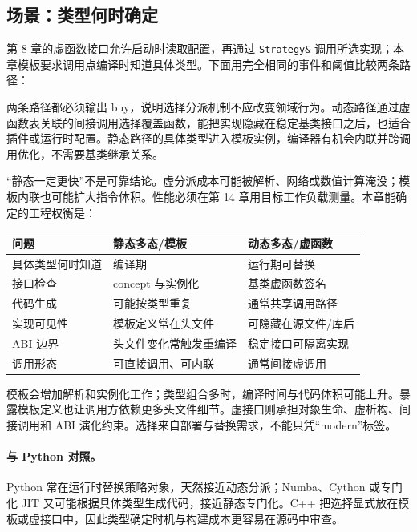 \subsection{场景：类型何时确定}

第 8 章的虚函数接口允许启动时读取配置，再通过 \texttt{Strategy\&} 调用所选实现；本章模板要求调用点编译时知道具体类型。下面用完全相同的事件和阈值比较两条路径：



两条路径都必须输出 buy，说明选择分派机制不应改变领域行为。动态路径通过虚函数表关联的间接调用选择覆盖函数，能把实现隐藏在稳定基类接口之后，也适合插件或运行时配置。静态路径的具体类型进入模板实例，编译器有机会内联并跨调用优化，不需要基类继承关系。

“静态一定更快”不是可靠结论。虚分派成本可能被解析、网络或数值计算淹没；模板内联也可能扩大指令体积。性能必须在第 14 章用目标工作负载测量。本章能确定的工程权衡是：

\begin{center}
\begin{tabular}{lll}
\toprule
问题 & 静态多态/模板 & 动态多态/虚函数 \\
\midrule
具体类型何时知道 & 编译期 & 运行期可替换 \\
接口检查 & concept 与实例化 & 基类虚函数签名 \\
代码生成 & 可能按类型重复 & 通常共享调用路径 \\
实现可见性 & 模板定义常在头文件 & 可隐藏在源文件/库后 \\
ABI 边界 & 头文件变化常触发重编译 & 稳定接口可隔离实现 \\
调用形态 & 可直接调用、可内联 & 通常间接虚调用 \\
\bottomrule
\end{tabular}
\end{center}

模板会增加解析和实例化工作；类型组合多时，编译时间与代码体积可能上升。暴露模板定义也让调用方依赖更多头文件细节。虚接口则承担对象生命、虚析构、间接调用和 ABI 演化约束。选择来自部署与替换需求，不能只凭“modern”标签。

\paragraph{与 Python 对照。}
Python 常在运行时替换策略对象，天然接近动态分派；Numba、Cython 或专门化 JIT 又可能根据具体类型生成代码，接近静态专门化。C++ 把选择显式放在模板或虚接口中，因此类型确定时机与构建成本更容易在源码中审查。

